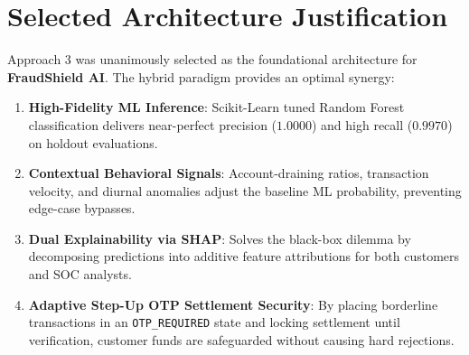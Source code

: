 \section{Selected Architecture Justification}
Approach 3 was unanimously selected as the foundational architecture for \textbf{FraudShield AI}. The hybrid paradigm provides an optimal synergy:
\begin{enumerate}[label=\alph*.]
    \item \textbf{High-Fidelity ML Inference}: Scikit-Learn tuned Random Forest classification delivers near-perfect precision ($1.0000$) and high recall ($0.9970$) on holdout evaluations.
    \item \textbf{Contextual Behavioral Signals}: Account-draining ratios, transaction velocity, and diurnal anomalies adjust the baseline ML probability, preventing edge-case bypasses.
    \item \textbf{Dual Explainability via SHAP}: Solves the black-box dilemma by decomposing predictions into additive feature attributions for both customers and SOC analysts.
    \item \textbf{Adaptive Step-Up OTP Settlement Security}: By placing borderline transactions in an \texttt{OTP\_REQUIRED} state and locking settlement until verification, customer funds are safeguarded without causing hard rejections.
\end{enumerate}
